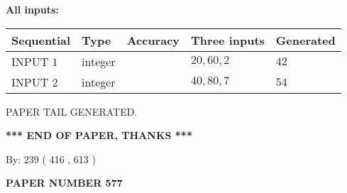 \documentclass[12pt]{article}
\begin{document}
   
   
   
\noindent{}
   
   
   
   
\noindent\vspace{0.1in}\hspace{-0.08in} {\textbf{\Large{All inputs: }}}
   
   
  
  
\noindent\begin{tabular}{|l|l|l|l|l|}
\hline
 Sequential & Type & Accuracy & Three inputs & Generated \\ 
\hline
 
 
  INPUT $  1 $ & integer &  & $
 20
 , 
 60
 , 
 2
 $ & $ 42 $ 
 \\  \hline  
 
 
  INPUT $  2 $ & integer &  & $
 40
 , 
 80
 , 
 7
 $ & $ 54 $ 
 \\  \hline  
 \end{tabular}
   
   
   
   
   
   
 \vspace{0.2in}
 
   
   
\vspace{2.0in} PAPER TAIL GENERATED.
   
   
   
   
\vspace{1.0in} 
{\textbf{\large{ *** END OF PAPER, THANKS *** }}} 
   
   
\hspace{1.0in} By: 
 239 ( 416 ,  613 )
   
   
   
   
\newpage 
\setcounter{page}{ 
   577001 } 
   
   
   
   
 {\textbf{ \Large{ PAPER NUMBER  577  }}}
   
   
\vspace{0.2in}
   
   
   
   
   
   
   
   
 \vspace{0.2in}
 
 
 
\end{document}
